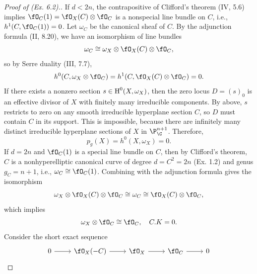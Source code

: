 \documentclass[a4paper]{article}
\begin{document}
\begin{enumerate} [label=\textbf{\arabic*.}, leftmargin=0em]
\begin{proof} [Proof of (Ex. 6.2).]
                  If $d < 2n$, the contrapositive of Clifford's theorem (IV, 5.6) implies $\fO_C(1) = \fO_X(C) \otimes \fO_C$ is a nonspecial line bundle on $C$, i.e., $h^1(C, \fO_C(1)) = 0$.
                  Let $\omega_C$ be the canonical sheaf of $C$.
                  By the adjunction formula (II, 8.20), we have an isomorphism of line bundles
                  \begin{equation*}
                        \omega_C \cong \omega_X \otimes \fO_X(C) \otimes \fO_C,
                  \end{equation*}
                  so by Serre duality (III, 7.7),
                  \begin{equation*}
                        h^0(C, \omega_X \otimes \fO_C) = h^1(C, \fO_X(C) \otimes \fO_C) = 0.
                  \end{equation*}
                  If there exists a nonzero section $s \in \operatorname{H}^0(X, \omega_X)$, then the zero locus $D = (s)_0$ is an effective divisor of $X$ with finitely many irreducible components.
                  By above, $s$ restricts to zero on any smooth irreducible hyperplane section $C$, so $D$ must contain $C$ in its support.
                  This is impossible, because there are infinitely many distinct irreducible hyperplane sections of $X$ in $\P^{n + 1}_\C$.
                  Therefore,
                  \begin{equation*}
                        p_g(X) = h^0(X, \omega_X) = 0.
                  \end{equation*}
                  If $d = 2n$ and $\fO_C(1)$ is a special line bundle on $C$, then by Clifford's theorem, $C$ is a nonhyperelliptic canonical curve of degree $d = C^2 = 2n$ (Ex. 1.2) and genus $g_C = n + 1$, i.e., $\omega_C \cong \fO_C(1)$.
                  Combining with the adjunction formula gives the isomorphism
                  \begin{equation*}
                        \omega_X \otimes \fO_X(C) \otimes \fO_C \cong \omega_C \cong \fO_X(C) \otimes \fO_C,
                  \end{equation*}
                  which implies
                  \begin{equation*}
                        \omega_X \otimes \fO_C \cong \fO_C, \quad C.K = 0.
                  \end{equation*}
                  Consider the short exact sequence
                  \[ \begin{tikzcd}
                              0 \arrow[r] & \fO_X(-C) \arrow[r] & \fO_X \arrow[r] & \fO_C \arrow[r] & 0

\end{tikzcd}\]
\end{proof}
\end{enumerate}
\end{document}

